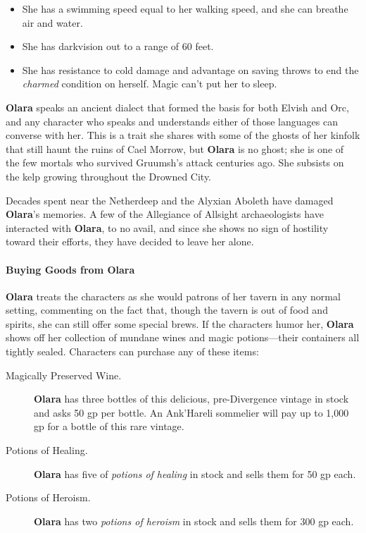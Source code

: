 \documentclass[a4paper, 11pt, bg=full, twocolumn, nooutline]{dndbook}
\begin{document}
\begin{itemize}
\item She has a swimming speed equal to her walking speed, and she can breathe air and water.
\item She has darkvision out to a range of 60 feet.
\item She has resistance to cold damage and advantage on saving throws to end the \textit{charmed} condition on herself. Magic can't put her to sleep.
\end{itemize}

\textbf{Olara} speaks an ancient dialect that formed the basis for both Elvish and Orc, and any character who speaks and understands either of those languages can converse with her. This is a trait she shares with some of the ghosts of her kinfolk that still haunt the ruins of Cael Morrow, but \textbf{Olara} is no ghost; she is one of the few mortals who survived Gruumsh's attack centuries ago. She subsists on the kelp growing throughout the Drowned City.

Decades spent near the Netherdeep and the Alyxian Aboleth have damaged \textbf{Olara}'s memories. A few of the Allegiance of Allsight archaeologists have interacted with \textbf{Olara}, to no avail, and since she shows no sign of hostility toward their efforts, they have decided to leave her alone.

\paragraph{Buying Goods from Olara}

\textbf{Olara} treats the characters as she would patrons of her tavern in any normal setting, commenting on the fact that, though the tavern is out of food and spirits, she can still offer some special brews. If the characters humor her, \textbf{Olara} shows off her collection of mundane wines and magic potions---their containers all tightly sealed. Characters can purchase any of these items:

\begin{description}
\item[Magically Preserved Wine.] \textbf{Olara} has three bottles of this delicious, pre-Divergence vintage in stock and asks 50 gp per bottle. An Ank'Hareli sommelier will pay up to 1,000 gp for a bottle of this rare vintage.
\item[Potions of Healing.] \textbf{Olara} has five of \textit{potions of healing} in stock and sells them for 50 gp each.
\item[Potions of Heroism.] \textbf{Olara} has two \textit{potions of heroism} in stock and sells them for 300 gp each.
\end{description}
\end{document}
